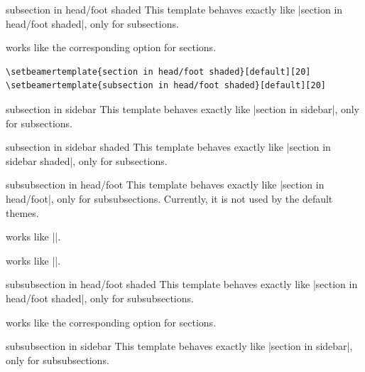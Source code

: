 \begin{element}{subsection in head/foot shaded}\yes\no\no
  This template behaves exactly like |section in head/foot shaded|, only for subsections.
  \begin{templateoptions}
    works like the corresponding option for sections.

    \example
\begin{verbatim}
\setbeamertemplate{section in head/foot shaded}[default][20]
\setbeamertemplate{subsection in head/foot shaded}[default][20]
\end{verbatim}
  \end{templateoptions}
\end{element}

\begin{element}{subsection in sidebar}\yes\yes\yes
  This template behaves exactly like |section in sidebar|, only for subsections.
\end{element}

\begin{element}{subsection in sidebar shaded}\yes\no\no
  This template behaves exactly like |section in sidebar shaded|, only for subsections.
\end{element}

\begin{element}{subsubsection in head/foot}\yes\yes\yes
  This template behaves exactly like |section in head/foot|, only for subsubsections. Currently, it is not used by the default themes.
  \begin{itemize}
    \iteminsert{\insertsubsubsectionhead}
    works like |\insertsectionhead|.

    \iteminsert{\insertsubsubsectionheadnumber}
    works like |\insertsectionheadnumber|.
  \end{itemize}
\end{element}

\begin{element}{subsubsection in head/foot shaded}\yes\no\no
  This template behaves exactly like |section in head/foot shaded|, only for subsubsections.
  \begin{templateoptions}
    works like the corresponding option for sections.
  \end{templateoptions}
\end{element}

\begin{element}{subsubsection in sidebar}\yes\yes\yes
  This template behaves exactly like |section in sidebar|, only for subsubsections.
\end{element}

